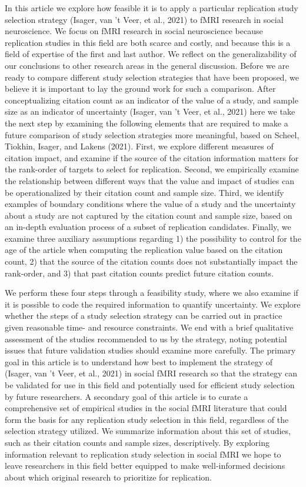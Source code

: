 \documentclass[
  man,floatsintext]{apa6}
\begin{document}
In this article we explore how feasible it is to apply a particular replication study selection strategy (Isager, van 't Veer, et al., 2021) to fMRI research in social neuroscience. We focus on fMRI research in social neuroscience because replication studies in this field are both scarce and costly, and because this is a field of expertise of the first and last author. We reflect on the generalizability of our conclusions to other research areas in the general discussion. Before we are ready to compare different study selection strategies that have been proposed, we believe it is important to lay the ground work for such a comparison. After conceptualizing citation count as an indicator of the value of a study, and sample size as an indicator of uncertainty (Isager, van 't Veer, et al., 2021) here we take the next step by examining the following elements that are required to make a future comparison of study selection strategies more meaningful, based on Scheel, Tiokhin, Isager, and Lakens (2021). First, we explore different measures of citation impact, and examine if the source of the citation information matters for the rank-order of targets to select for replication. Second, we empirically examine the relationship between different ways that the value and impact of studies can be operationalized by their citation count and sample size. Third, we identify examples of boundary conditions where the value of a study and the uncertainty about a study are not captured by the citation count and sample size, based on an in-depth evaluation process of a subset of replication candidates. Finally, we examine three auxiliary assumptions regarding 1) the possibility to control for the age of the article when computing the replication value based on the citation count, 2) that the source of the citation counts does not substantially impact the rank-order, and 3) that past citation counts predict future citation counts.

We perform these four steps through a feasibility study, where we also examine if it is possible to code the required information to quantify uncertainty. We explore whether the steps of a study selection strategy can be carried out in practice given reasonable time- and resource constraints. We end with a brief qualitative assessment of the studies recommended to us by the strategy, noting potential issues that future validation studies should examine more carefully. The primary goal in this article is to understand how best to implement the strategy of (Isager, van 't Veer, et al., 2021) in social fMRI research so that the strategy can be validated for use in this field and potentially used for efficient study selection by future researchers. A secondary goal of this article is to curate a comprehensive set of empirical studies in the social fMRI literature that could form the basis for any replication study selection in this field, regardless of the selection strategy utilized. We summarize information about this set of studies, such as their citation counts and sample sizes, descriptively. By exploring information relevant to replication study selection in social fMRI we hope to leave researchers in this field better equipped to make well-informed decisions about which original research to prioritize for replication.
\end{document}
